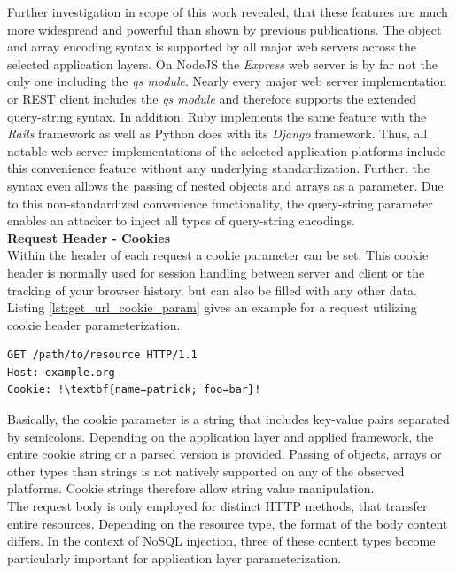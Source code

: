 Further investigation in scope of this work revealed, that these features are much more widespread and powerful than shown by previous publications. The object and array encoding syntax is supported by all major web servers across the selected application layers. On NodeJS the \textit{Express} web server is by far not the only one including the \textit{qs module}. Nearly every major web server implementation or REST client includes the \textit{qs module} and therefore supports the extended query-string syntax. In addition, Ruby implements the same feature with the \textit{Rails} framework as well as Python does with its \textit{Django} framework. Thus, all notable web server implementations of the selected application platforms include this convenience feature without any underlying standardization. Further, the syntax even allows the passing of nested objects and arrays as a parameter. Due to this non-standardized convenience functionality, the query-string parameter enables an attacker to inject all types of query-string encodings. \\

\textbf{Request Header - Cookies}\\
Within the header of each request a cookie parameter can be set. This cookie header is normally used for session handling between server and client or the tracking of your browser history, but can also be filled with any other data. Listing \ref{lst:get_url_cookie_param} gives an example for a request utilizing cookie header parameterization. \\

\begin{lstlisting}[escapechar=!, caption={Example for GET request with cookie header parameterization}, label={lst:get_url_cookie_param}]
GET /path/to/resource HTTP/1.1
Host: example.org
Cookie: !\textbf{name=patrick; foo=bar}!
\end{lstlisting}

Basically, the cookie parameter is a string that includes key-value pairs separated by semicolons. Depending on the application layer and applied framework, the entire cookie string or a parsed version is provided. Passing of objects, arrays or other types than strings is not natively supported on any of the observed platforms. Cookie strings therefore allow string value manipulation. \\

The request body is only employed for distinct HTTP methods, that transfer entire resources. Depending on the resource type, the format of the body content differs. In the context of NoSQL injection, three of these content types become particularly important for application layer parameterization. \\

